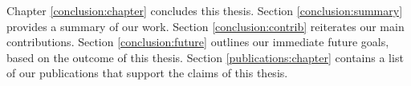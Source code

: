 Chapter \ref{conclusion:chapter} concludes this thesis. Section
\ref{conclusion:summary} provides a summary of our work. Section
\ref{conclusion:contrib} reiterates our main contributions. Section
\ref{conclusion:future} outlines our immediate future goals, based on the
outcome of this thesis. Section \ref{publications:chapter} contains a list of
our publications that support the claims of this thesis.

